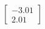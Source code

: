 \documentclass[preview]{standalone}
\begin{document}
\begin{align*}
\begin{bmatrix} -3.01 \\ 2.01 \end{bmatrix}
\end{align*}
\end{document}
